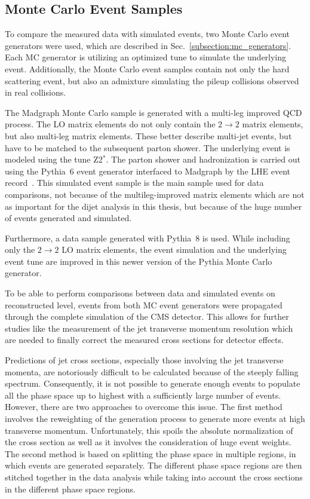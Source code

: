 \subsection{Monte Carlo Event Samples}

To compare the measured data with simulated events, two
Monte Carlo event generators were used, which are described in
Sec.~\ref{subsection:mc_generators}. Each MC generator is utilizing an optimized
tune to simulate the underlying event. Additionally, the Monte Carlo event samples
contain not only the hard scattering event, but also an admixture
simulating the pileup collisions observed in real collisions.

The Madgraph Monte Carlo sample is generated with a multi-leg improved QCD
process. The LO matrix elements do not only contain the $2
\rightarrow 2$ matrix elements, but also multi-leg matrix elements. These better
describe multi-jet events, but have to be matched to the subsequent parton
shower. The underlying event is modeled using the tune Z2$^*$. The parton shower
and hadronization is carried out using the Pythia~6 event generator interfaced
to Madgraph by the LHE event record~\cite{Alwall:2006yp}. This simulated event
sample is the main sample used for data comparisons, not because of the
multileg-improved matrix elements which are not as important for the dijet
analysis in this thesis, but because of the huge number of events generated and simulated.

Furthermore, a data sample generated with Pythia~8 is used. While including only the $2
\rightarrow 2$ LO matrix elements, the event simulation and the underlying event
tune are improved in this newer version of the Pythia Monte Carlo generator.

To be able to perform comparisons between data and simulated events on
reconstructed level, events from both MC event generators were propagated
through the complete simulation of the CMS detector. This allows for further
studies like the measurement of the jet transverse momentum resolution which are
needed to finally correct the measured cross sections for detector effects.

Predictions of jet cross sections, especially those involving the jet transverse
momenta, are notoriously difficult to be calculated because of the steeply
falling spectrum. Consequently, it is not possible to generate enough events to
populate all the phase space up to highest \pt with a sufficiently large
number of events. However, there are two approaches to overcome this issue.
The first method involves the reweighting of the generation process to generate
more events at high transverse momentum. Unfortunately, this spoils the absolute
normalization of the cross section as well as it involves the consideration of
huge event weights. The second method is based on splitting the phase space in
multiple regions, in which events are generated separately. The different phase
space regions are then stitched together in the data analysis while taking
into account the cross sections in the different phase space regions. 

